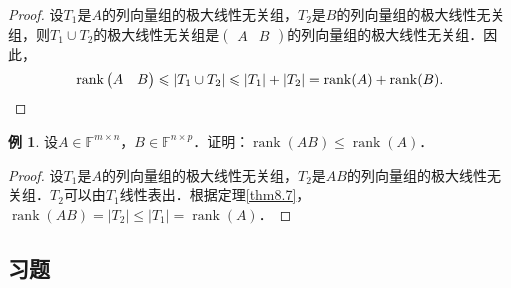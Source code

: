 \documentclass[a4paper,fontset=windows]{ctexbook}
\theoremstyle{definition}
\newtheorem{example}{例}[chapter]
\DeclareMathOperator{\rank}{rank}
\renewcommand{\le}{\leqslant}
\begin{document}
\begin{proof}
设$T_1$是$A$的列向量组的极大线性无关组，$T_2$是$B$的列向量组的极大线性无关组，则$T_1\cup T_2$的极大线性无关组是$\begin{pmatrix}A&B\end{pmatrix}$的列向量组的极大线性无关组．因此，
\begin{equation*}
\rank\begin{pmatrix}A&B\end{pmatrix}\le|T_1\cup T_2|\le|T_1|+|T_2|=\rank(A)+\rank(B). \qedhere
\end{equation*}
\end{proof}

\begin{example}
设$A\in\mathbb{F}^{m\times n}$，$B\in\mathbb{F}^{n\times p}$．证明：$\rank(AB)\le\rank(A)$．
\end{example}

\begin{proof}
设$T_1$是$A$的列向量组的极大线性无关组，$T_2$是$AB$的列向量组的极大线性无关组．$T_2$可以由$T_1$线性表出．根据定理\ref{thm8.7}，$\rank(AB)=|T_2|\le|T_1|=\rank(A)$．
\end{proof}

\subsection*{习题}
\end{document}
